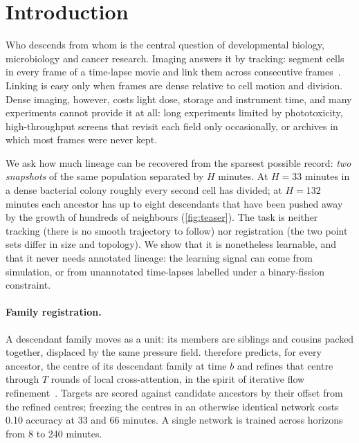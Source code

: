 \section{Introduction}
\label{sec:intro}

Who descends from whom is the central question of developmental biology, microbiology and cancer research.
Imaging answers it by tracking: segment cells in every frame of a time-lapse movie and link them across consecutive frames~\cite{ulman2017objective,maska2023ctc}.
Linking is easy only when frames are dense relative to cell motion and division.
Dense imaging, however, costs light dose, storage and instrument time, and many experiments cannot provide it at all: long experiments limited by phototoxicity, high-throughput screens that revisit each field only occasionally, or archives in which most frames were never kept.

We ask how much lineage can be recovered from the sparsest possible record: \emph{two snapshots} of the same population separated by $H$ minutes.
At $H{=}33$ minutes in a dense bacterial colony roughly every second cell has divided; at $H{=}132$ minutes each ancestor has up to eight descendants that have been pushed away by the growth of hundreds of neighbours (\cref{fig:teaser}).
The task is neither tracking (there is no smooth trajectory to follow) nor registration (the two point sets differ in size and topology).
We show that it is nonetheless learnable, and that it never needs annotated lineage: the learning signal can come from simulation, or from unannotated time-lapses labelled under a binary-fission constraint.

\paragraph{Family registration.}
A descendant family moves as a unit: its members are siblings and cousins packed together, displaced by the same pressure field.
\ours therefore predicts, for every ancestor, the centre of its descendant family at time $b$ and refines that centre through $T$ rounds of local cross-attention, in the spirit of iterative flow refinement~\cite{teed2020raft}.
Targets are scored against candidate ancestors by their offset from the refined centres; freezing the centres in an otherwise identical network costs 0.10 accuracy at 33 and 66 minutes.
A single network is trained across horizons from 8 to 240 minutes.

